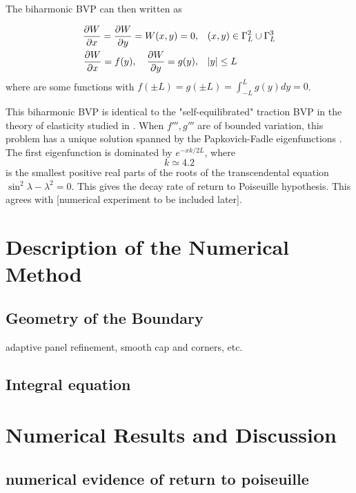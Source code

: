 \documentclass[10pt,twocolumn]{article}
\newtheorem[L]{thm}{Theorem}[section]
\begin{document}
The biharmonic BVP can then written as 

\begin{align}
  \pdv{W}{x}(x,y) = \pdv{W}{y}(x,y) = W(x,y) = 0, \quad &(x,y) \in \Gamma_L^2 \cup \Gamma_L^3 \\
  \pdv{W}{x}(0,y) = f(y),\quad \pdv{W}{y}(0,y) = g(y), \quad &|y| \le L
\end{align}
where are some functions with $f(\pm L) = g(\pm L) = \int_{-L}^L g(y)dy = 0$. 


This biharmonic BVP is identical to the "self-equilibrated" traction BVP in the theory of elasticity studied in
\cite{gregoryTractionBoundaryValue1980,horganDECAYESTIMATESBIHARMONIC1989,coRecentDevelopmentsConcerning1983}. 
When $f''',g'''$ are of bounded variation, 
this problem has a unique solution spanned by the Papkovich-Fadle eigenfunctions \cite{gregoryTractionBoundaryValue1980}.
The first eigenfunction is dominated by $e^{-xk/2L}$, where $$k \simeq 4.2$$ 
is the smallest positive real parts of the roots 
of the transcendental equation $\sin^2\lambda - \lambda^2=0$. 
This gives the decay rate of return to Poiseuille hypothesis. This agrees with [numerical experiment to be included later]. 



\section{Description of the Numerical Method\label{sec:numericalmethod}}

\subsection{Geometry of the Boundary}

adaptive panel refinement, smooth cap and corners, etc.


\subsection{Integral equation}

\section{Numerical Results and Discussion\label{sec:numericalresults}}

\subsection{numerical evidence of return to poiseuille}
\end{document}
